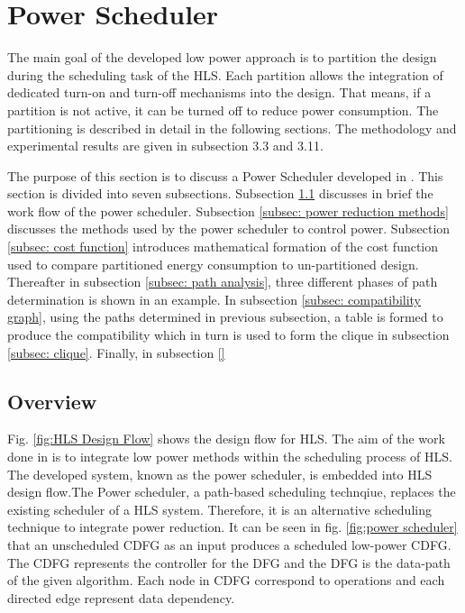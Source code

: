 \documentclass[conference]{IEEEtran}
\begin{document}
\section{Power Scheduler}\label{AA}
\label{sec: power scheduler}
The main goal of the developed low power approach is to partition the design during the scheduling task of the HLS. Each partition allows the integration of dedicated turn-on and turn-off mechanisms into the design. That means, if a partition is not active, it can be turned off to reduce power consumption. The partitioning is described in detail in the following sections. The methodology and experimental results are given in subsection 3.3 and 3.11. 

The purpose of this section is to discuss a Power Scheduler developed in \cite{Ret}. This section is divided into seven subsections. Subsection \ref{subsec: overview} discusses in brief the work flow of the power scheduler. Subsection \ref{subsec: power reduction methods} discusses the methods used by the power scheduler to control power. Subsection \ref{subsec: cost function} introduces mathematical formation of the cost function used to compare partitioned energy consumption to un-partitioned design. Thereafter in subsection \ref{subsec: path analysis}, three different phases of path determination is shown in an example. In subsection \ref{subsec: compatibility graph}, using the paths determined in previous subsection, a table is formed to produce the compatibility which in turn is used to form the clique in subsection \ref{subsec: clique}. Finally, in subsection \ref{} 
\subsection{Overview}
\label{subsec: overview}
Fig. \ref{fig:HLS Design Flow} shows the design flow for HLS. The aim of the work done in \cite{Ret} is to integrate low power methods within the scheduling process of HLS. The developed system, known as the power scheduler, is embedded into HLS design flow.The Power scheduler, a path-based scheduling technqiue, replaces the existing scheduler of a HLS system. Therefore, it is an alternative scheduling technique to integrate power reduction. It can be seen in fig. \ref{fig:power scheduler} that an unscheduled CDFG as an input produces a scheduled low-power CDFG. The CDFG represents the controller for the DFG and the DFG is the data-path of the given algorithm. Each node in CDFG correspond to operations and each directed edge represent data dependency. 
\end{document}
